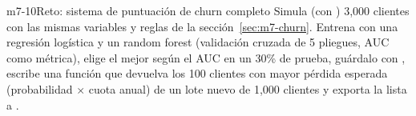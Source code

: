 \begin{ejercicio}{m7-10}{Reto: sistema de puntuación de churn completo}
Simula (con ) 3{,}000 clientes con las mismas variables
y reglas de la sección~\ref{sec:m7-churn}. Entrena con  una
regresión logística y un random forest (validación cruzada de 5 pliegues, AUC
como métrica), elige el mejor según el AUC en un 30\% de prueba, guárdalo con
, escribe una función  que devuelva los
100 clientes con mayor pérdida esperada (probabilidad $\times$ cuota anual) de
un lote nuevo de 1{,}000 clientes y exporta la lista a
.
\end{ejercicio}
